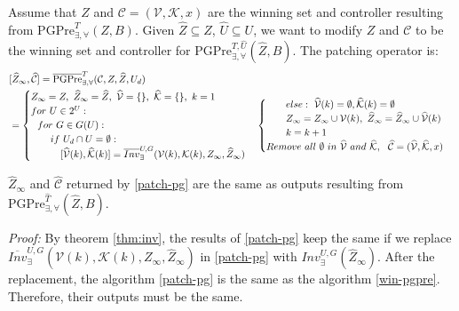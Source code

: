 Assume that $ Z $ and $ \mathcal{C} = (\mathcal{V},\mathcal{K},x) $ are the winning set and controller resulting from  $ \text{PGPre}_{\exists,\forall}^{T} (Z,B)$. Given $ \widehat{Z}\subseteq Z $,  $ \widehat{U}\subseteq U $, we want to modify $ Z $ and $ \mathcal{C} $ to be the winning set and controller for $ \text{PGPre}_{\exists, \forall}^{T,\widehat{U}}(\widehat{Z},B)$. The patching operator is:
{\small\begin{align}
\begin{split}
&[\widehat{Z}_{\infty},\widehat{\mathcal{C}}]=\overline{\text{PGPre}}_{\exists,\forall}^{T} (\mathcal{C},Z,\widehat{Z},U_d)\\
&= \begin{cases}
Z_{\infty} = Z,\ \widehat{Z}_{\infty}=\widehat{Z},\ \widehat{\mathcal{V}}=\{\},\ \widehat{\mathcal{K}}=\{\},\ k = 1\\
for\ U\in 2^U:\\
\ \ for\ G\in G(U):\\
\ \ \ \ \ \ if\ U_d\cap U = \emptyset:\\
\ \ \ \ \ \ \ \ \  [\widehat{\mathcal{V}}(k),\widehat{\mathcal{K}}(k)]=\overline{Inv}_{\exists}^{U,G}(\mathcal{V}(k),\mathcal{K}(k),Z_\infty, \widehat{Z}_\infty)\\
\end{cases}
\begin{cases}
\ \ \ \ \ \ else:\ \widehat{\mathcal{V}}(k)=\emptyset, \widehat{\mathcal{K}}(k) = \emptyset\\
\ \ \ \ \ \  Z_\infty = Z_\infty\cup \mathcal{V}(k),\ \widehat{Z}_{\infty} = \widehat{Z}_{\infty} \cup \widehat{\mathcal{V}}(k)\\
\ \ \ \ \ \ {\color{black} k = k+1}\\
Remove\ all\ \emptyset\ in\ \widehat{\mathcal{V}}\ and \ \widehat{\mathcal{K}},\ \ 
\widehat{\mathcal{C}} = (\widehat{\mathcal{V}},\widehat{\mathcal{K}},x)
\end{cases}\label{patch-pg}
\end{split}
\end{align}}

\begin{theorem}
	$ \widehat{Z}_\infty $ and $ \widehat{\mathcal{C}} $ returned by \eqref{patch-pg} are the same as outputs resulting from $ \text{PGPre}_{\exists, \forall}^{\widehat{T}}(\widehat{Z},B)$.	\label{thm:pg}
\end{theorem}

\emph{Proof:} By theorem \ref{thm:inv}, the results of \eqref{patch-pg} keep the same if we replace $ \overline{Inv}_{\exists}^{U,G}(\mathcal{V}(k),\mathcal{K}(k),Z_\infty, \widehat{Z}_\infty)$ in \eqref{patch-pg} with $ Inv_\exists^{U,G}(\widehat{Z}_{\infty}) $. After the replacement, the algorithm \eqref{patch-pg} is the same as the algorithm \eqref{win-pgpre}. Therefore, their outputs must be the same. \QEDB


